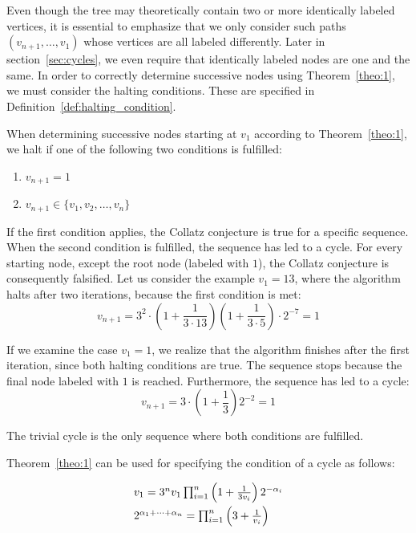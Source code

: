 Even though the tree may theoretically contain two or more identically labeled vertices, it is essential to emphasize that we only consider such paths $(v_{n+1},\ldots,v_1)$ whose vertices are all labeled differently. Later in section~\ref{sec:cycles}, we even require that identically labeled nodes are one and the same. In order to correctly determine successive nodes using Theorem~\ref{theo:1}, we must consider the halting conditions. These are specified in Definition~\ref{def:halting_condition}.


\begin{definition}
	\label{def:halting_condition}
	When determining successive nodes starting at $v_1$ according to Theorem~\ref{theo:1}, we halt if one of the following two conditions is fulfilled:
	\begin{enumerate}
		\item $v_{n+1}=1$
		\item $v_{n+1}\in\{v_1,v_2,\ldots,v_n\}$
	\end{enumerate}
	If the first condition applies, the Collatz conjecture is true for a specific sequence. When the second condition is fulfilled, the sequence has led to a cycle. For every starting node, except the root node (labeled with $1$), the Collatz conjecture is consequently falsified. Let us consider the example $v_1=13$, where the algorithm halts after two iterations, because the first condition is met:
	\[
	v_{n+1}=3^2\cdot\left(1+\frac{1}{3\cdot13}\right)\left(1+\frac{1}{3\cdot5}\right)\cdot2^{-7}=1
	\]
	
	If we examine the case $v_{1}=1$, we realize that the algorithm finishes after the first iteration, since both halting conditions are true. The sequence stops because the final node labeled with $1$ is reached. Furthermore, the sequence has led to a cycle:
	\[
	v_{n+1}=3\cdot\left(1+\frac{1}{3}\right)2^{-2}=1
	\]
	
	The trivial cycle is the only sequence where both conditions are fulfilled.
\end{definition}

\noindent
Theorem~\ref{theo:1} can be used for specifying the condition of a cycle as follows:

\begin{equation}
\label{eq:func_cycle}
\begin{array}{l}
v_{1}=3^nv_1\prod_{i=1}^{n}\left(1+\frac{1}{3v_i}\right)2^{-\alpha_i}
\\[\medskipamount]
2^{\alpha_1+\cdots+\alpha_n}=\prod_{i=1}^{n}\left(3+\frac{1}{v_i}\right)
\end{array}
\end{equation}

